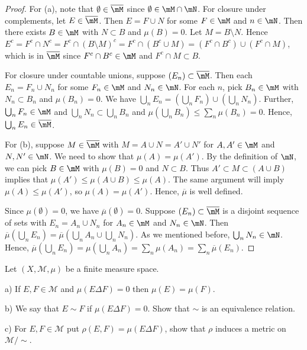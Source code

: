 \documentclass{article}
\begin{document}
\begin{proof}
For (a), note that $\emptyset \in \overline \mM$ since $\emptyset \in \mM \cap \mN$.  For closure under complements, let $E \in \overline \mM$.  Then $E  = F \cup N$ for some $F \in \mM$ and $n \in \mN$. Then there exists $B \in \mM$ with $N \subset B$ and $\mu(B) = 0$.  Let $M = B \setminus N$.  Hence $E^c = F^c \cap N^c = F^c \cap (B \setminus M)^c = F^c \cap (B^c \cup M) = (F^c \cap B^c) \cup (F^c \cap M)$, which is in $\overline \mM$ since $F^c \cap B^c \in \mM$ and $F^c \cap M \subset B$.  

For closure under countable unions, suppose $(E_n) \subset \overline \mM$.  Then each $E_n = F_n \cup N_n$ for some $F_n \in \mM$ and $N_n \in \mN$.
For each $n$, pick $B_n \in \mM$ with $N_n \subset B_n$ and $\mu(B_n) = 0$. We have $\bigcup_n E_n = (\bigcup_n F_n) \cup (\bigcup_n N_n)$. Further, $\bigcup_n F_n \in \mM$ and $\bigcup_n N_n \subset \bigcup_n B_n$ and $\mu(\bigcup_n B_n) \le \sum_n \mu(B_n) = 0$.  Hence, $\bigcup_n E_n \in \overline \mM$.

For (b), suppose $M \in \overline \mM$ with $M = A \cup N = A' \cup N'$ for $A, A' \in \mM$ and $N, N' \in \mN$.  We need to show that $\mu(A) = \mu(A')$.
By the definition of $\mN$, we can pick $B \in \mM$ with $\mu(B) = 0$ and $N \subset B$.  Thus $A' \subset M \subset (A \cup B)$ implies that $\mu(A') \le \mu(A \cup B) \le \mu(A)$.  The same argument will imply $\mu(A) \le \mu(A')$, so $\mu(A) = \mu(A')$. Hence, $\overline \mu$ is well defined.

Since $\mu(\emptyset) = 0$, we have $\overline \mu(\emptyset) = 0$. Suppose $(E_n) \subset \overline \mM$ is a disjoint sequence of sets with $E_n = A_n \cup N_n$ for $A_n \in \mM$ and $N_n \in \mN$.  Then $\overline \mu (\bigcup_n E_n) = \overline \mu( \bigcup_n A_n \cup \bigcup_n N_n)$.  As we mentioned before, $\bigcup_n N_n \in \mN$.  Hence, $\overline \mu (\bigcup_n E_n) = \mu(\bigcup_n A_n) = \sum_n \mu(A_n) = \sum_n \overline \mu (E_n)$.
\end{proof}

 Let $(X , \mathcal M, \mu)$ be a finite measure space. 

a) If $E, F \in \mathcal M$ and $\mu(E \Delta F) = 0$ then $\mu(E) = \mu(F)$.

b) We say that $E \sim F$ if $\mu (E \Delta F) = 0$. Show that $\sim$ is an equivalence relation.

c) For $E, F \in \mathcal M$ put $\rho(E, F) = \mu(E \Delta F)$, show that $\rho$ induces a metric on $\mathcal M / \sim$.
\end{document}
